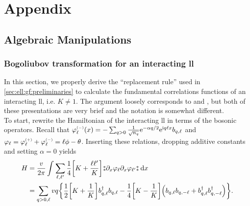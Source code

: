 \chapter{Appendix}\label{chap:app}
\section{Algebraic Manipulations}\label{sec:algebra}
\subsection{Bogoliubov transformation for an interacting \texorpdfstring{\acrshort{ll}}{LL}}\label{sec:app:bogoliubov_transform_interacting_LL} %
In this section, we properly derive the ``replacement rule'' used in \autoref{sec:ell:gf:preliminaries} to calculate the fundamental correlations functions of an interacting \gls{ll}, i.e. $K\neq 1$.
The argument loosely corresponds to \cite[\ssec 10.B.2]{Bosonization_DelftSchoeller_1998} and \cite[]{Bosonization_Rao_2001}, but both of these presentations are very brief and the notation is somewhat different.\\
To start, rewrite the Hamiltonian of the interacting \gls{ll} in terms of the bosonic operators.
Recall that $\varphi_\ell^{\scriptscriptstyle{(-)}}(x) = -\sum_{q>0} \frac{1}{\sqrt{n_q}} \text{e}^{-\alpha q/2} \text{e}^{\text{i} q\ell x} b_{q,\ell}$ and $\varphi_\ell=\varphi_\ell^{\scriptscriptstyle{(+)}} + \varphi_\ell^{\scriptscriptstyle{(-)}} = \ell\phi - \theta$.
Inserting these relations, dropping additive constants and setting $\alpha=0$ yields
\begin{align*}
H &= \frac{v}{2\pi} \intx{ }{ }{ \sum_{\ell,\ell'} \frac{1}{4} \klb*{K + \frac{\ell\ell'}{K}} \varnormord{\partial_x\varphi_\ell \partial_x\varphi_{\ell'}} }{x}\\
&= \sum_{q>0,\ell} vq \klc*{\frac{1}{2} \klb*{K + \frac{1}{K}} b_{q,\ell}^\dagger b_{q,\ell} - \frac{1}{4} \klb*{K - \frac{1}{K}} \kla*{b_{q,\ell} b_{q,-\ell} + b_{q,\ell}^\dagger b_{q,-\ell}^\dagger}}.
\end{align*}
